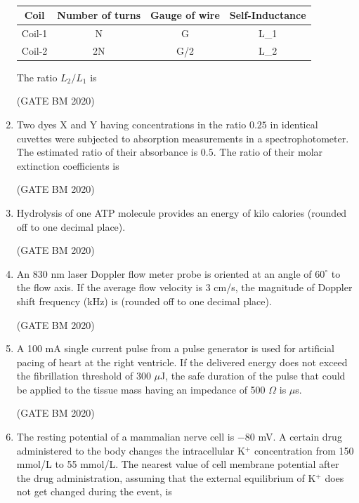 \documentclass[journal]{IEEEtran}
\begin{document}
\begin{enumerate}
\begin{table}[H]                                    
\centering\normalsize
\begin{tabular}{|c|c|c|c|}
\hline
Coil & Number of turns & Gauge of wire & Self-Inductance \\
\hline
Coil-1 & N & G & L\_1 \\
\hline
Coil-2 & 2N & G/2 & L\_2 \\
\hline
\end{tabular}
	\caption{}
	\label{tab:Q21}
\end{table}
The ratio $L_2/L_1$ is \underline{\hspace{2cm}}


\hfill(GATE BM 2020)
\item Two dyes X and Y having concentrations in the ratio $0.25$ in identical cuvettes were subjected to absorption measurements in a spectrophotometer. The estimated ratio of their absorbance is $0.5$. The ratio of their molar extinction coefficients is \underline{\hspace{2cm}}


	\hfill(GATE BM 2020)
\item Hydrolysis of one ATP molecule provides an energy of \underline{\hspace{2cm}} kilo calories (rounded off to one decimal place).


	\hfill(GATE BM 2020)
\item An 830 nm laser Doppler flow meter probe is oriented at an angle of $60^\circ$ to the flow axis. If the average flow velocity is 3 cm/s, the magnitude of Doppler shift frequency (kHz) is \underline{\hspace{2cm}} (rounded off to one decimal place).


	\hfill(GATE BM 2020)

\item A 100 mA single current pulse from a pulse generator is used for artificial pacing of heart at the right ventricle. If the delivered energy does not exceed the fibrillation threshold of 300 $\mu$J, the safe duration of the pulse that could be applied to the tissue mass having an impedance of 500 $\Omega$ is \underline{\hspace{2cm}} $\mu$s.

	\hfill(GATE BM 2020)

\item  The resting potential of a mammalian nerve cell is $-80$ mV. A certain drug administered to the body changes the intracellular K$^+$ concentration from 150 mmol/L to 55 mmol/L. The nearest value of cell membrane potential after the drug administration, assuming that the external equilibrium of K$^+$ does not get changed during the event, is 


\end{enumerate}
\end{document}
